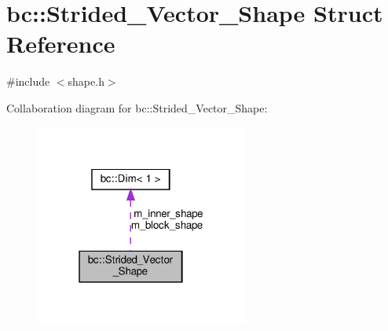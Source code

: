 \hypertarget{structbc_1_1Strided__Vector__Shape}{}\section{bc\+:\+:Strided\+\_\+\+Vector\+\_\+\+Shape Struct Reference}
\label{structbc_1_1Strided__Vector__Shape}


{\ttfamily \#include $<$shape.\+h$>$}



Collaboration diagram for bc\+:\+:Strided\+\_\+\+Vector\+\_\+\+Shape\+:\nopagebreak
\begin{figure}[H]
\begin{center}
\leavevmode
\includegraphics[width=199pt]{structbc_1_1Strided__Vector__Shape__coll__graph}
\end{center}
\end{figure}
